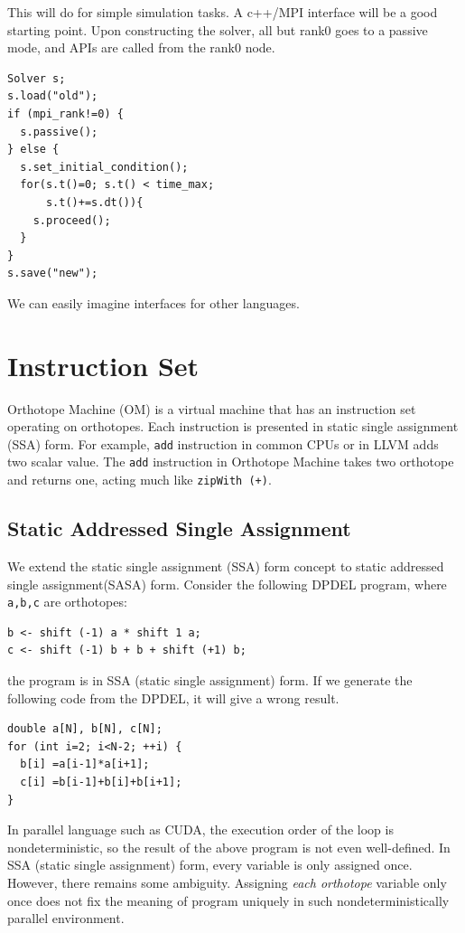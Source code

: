 \documentclass[twocolumn]{article}
\begin{document}
This will do for simple simulation tasks. A c++/MPI interface will be a good
starting point. Upon constructing the solver, all but rank0 goes to a passive
mode, and APIs are called from the rank0 node.

\begin{verbatim}
Solver s;
s.load("old");
if (mpi_rank!=0) {
  s.passive();
} else {
  s.set_initial_condition();
  for(s.t()=0; s.t() < time_max;
      s.t()+=s.dt()){
    s.proceed();
  }
}
s.save("new");
\end{verbatim}

We can easily imagine interfaces for other languages.


\section{Instruction Set}
\label{SectionInst}

Orthotope Machine (OM) is a virtual machine that has an instruction set
operating on orthotopes. Each instruction is presented in static single
assignment (SSA) form. For example, {\tt add} instruction in common CPUs or in
LLVM adds two scalar value. The {\tt add} instruction in Orthotope Machine
takes two orthotope and returns one, acting much like {\tt zipWith (+)}.

\subsection{Static Addressed Single Assignment} \label{SectionSASA}

We extend the static single assignment (SSA) form concept to static addressed
single assignment(SASA) form.  Consider the following DPDEL program, where
{\tt a,b,c} are orthotopes:
\begin{verbatim}
b <- shift (-1) a * shift 1 a;
c <- shift (-1) b + b + shift (+1) b;
\end{verbatim}
the program is in SSA (static single assignment) form.
If we generate the following code from the DPDEL, it will give a wrong result.
\begin{verbatim}
double a[N], b[N], c[N];
for (int i=2; i<N-2; ++i) {
  b[i] =a[i-1]*a[i+1];
  c[i] =b[i-1]+b[i]+b[i+1];
}
\end{verbatim}
In parallel language such as CUDA, the execution order of the loop is
nondeterministic, so the result of the above program is not even
well-defined. In SSA (static single assignment) form, every variable is only
assigned once. However, there remains some ambiguity.  Assigning {\em each
  orthotope} variable only once does not fix the meaning of program uniquely
in such nondeterministically parallel environment.
\end{document}
